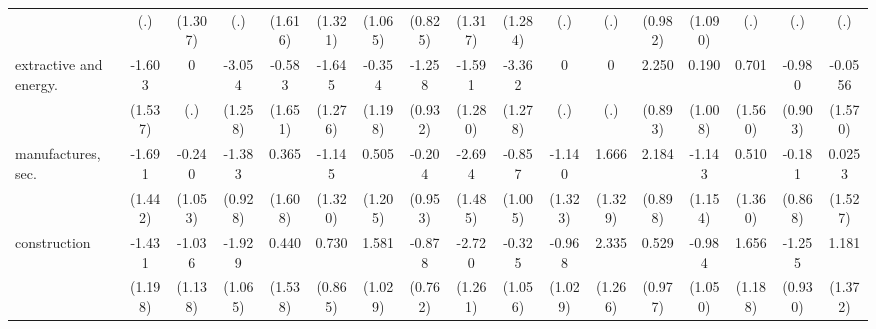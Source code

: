 {\begin{tabular}{l*{16}{c}}
                    &         (.)         &     (1.307)         &         (.)         &     (1.616)         &     (1.321)         &     (1.065)         &     (0.825)         &     (1.317)         &     (1.284)         &         (.)         &         (.)         &     (0.982)         &     (1.090)         &         (.)         &         (.)         &         (.)         \\
[1em]
extractive and energy.&      -1.603         &           0         &      -3.054\sym{*}  &      -0.583         &      -1.645         &      -0.354         &      -1.258         &      -1.591         &      -3.362\sym{**} &           0         &           0         &       2.250\sym{*}  &       0.190         &       0.701         &      -0.980         &     -0.0556         \\
                    &     (1.537)         &         (.)         &     (1.258)         &     (1.651)         &     (1.276)         &     (1.198)         &     (0.932)         &     (1.280)         &     (1.278)         &         (.)         &         (.)         &     (0.893)         &     (1.008)         &     (1.560)         &     (0.903)         &     (1.570)         \\
[1em]
manufactures, sec.  &      -1.691         &      -0.240         &      -1.383         &       0.365         &      -1.145         &       0.505         &      -0.204         &      -2.694         &      -0.857         &      -1.140         &       1.666         &       2.184\sym{*}  &      -1.143         &       0.510         &      -0.181         &      0.0253         \\
                    &     (1.442)         &     (1.053)         &     (0.928)         &     (1.608)         &     (1.320)         &     (1.205)         &     (0.953)         &     (1.485)         &     (1.005)         &     (1.323)         &     (1.329)         &     (0.898)         &     (1.154)         &     (1.360)         &     (0.868)         &     (1.527)         \\
[1em]
construction        &      -1.431         &      -1.036         &      -1.929         &       0.440         &       0.730         &       1.581         &      -0.878         &      -2.720\sym{*}  &      -0.325         &      -0.968         &       2.335         &       0.529         &      -0.984         &       1.656         &      -1.255         &       1.181         \\
                    &     (1.198)         &     (1.138)         &     (1.065)         &     (1.538)         &     (0.865)         &     (1.029)         &     (0.762)         &     (1.261)         &     (1.056)         &     (1.029)         &     (1.266)         &     (0.977)         &     (1.050)         &     (1.188)         &     (0.930)         &     (1.372)         \\

\end{tabular}}
